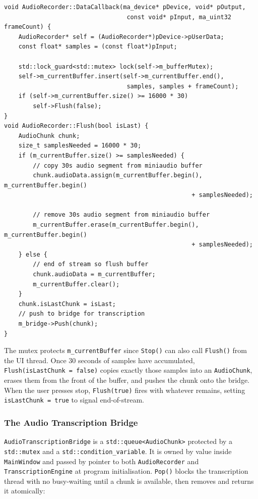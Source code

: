 \begin{verbatim}
void AudioRecorder::DataCallback(ma_device* pDevice, void* pOutput,
                                  const void* pInput, ma_uint32 frameCount) {
    AudioRecorder* self = (AudioRecorder*)pDevice->pUserData;
    const float* samples = (const float*)pInput;

    std::lock_guard<std::mutex> lock(self->m_bufferMutex);
    self->m_currentBuffer.insert(self->m_currentBuffer.end(),
                                  samples, samples + frameCount);
    if (self->m_currentBuffer.size() >= 16000 * 30)
        self->Flush(false);
}
void AudioRecorder::Flush(bool isLast) {
    AudioChunk chunk;
    size_t samplesNeeded = 16000 * 30;
    if (m_currentBuffer.size() >= samplesNeeded) {
        // copy 30s audio segment from miniaudio buffer
        chunk.audioData.assign(m_currentBuffer.begin(), m_currentBuffer.begin() 
                                                    + samplesNeeded);

        // remove 30s audio segment from miniaudio buffer
        m_currentBuffer.erase(m_currentBuffer.begin(), m_currentBuffer.begin() 
                                                    + samplesNeeded);
    } else {
        // end of stream so flush buffer
        chunk.audioData = m_currentBuffer;
        m_currentBuffer.clear();
    }
    chunk.isLastChunk = isLast;
    // push to bridge for transcription
    m_bridge->Push(chunk);
}
\end{verbatim}

The mutex protects \texttt{m\_currentBuffer} since \texttt{Stop()} can also call \texttt{Flush()} from the UI thread. Once 30 seconds of samples have accumulated, \texttt{Flush(isLastChunk = false)} copies exactly those samples into an \texttt{AudioChunk}, erases them from the front of the buffer, and pushes the chunk onto the bridge. When the user presses stop, \texttt{Flush(true)} fires with whatever remains, setting \texttt{isLastChunk = true} to signal end-of-stream.

\subsubsection{The Audio Transcription Bridge}
\texttt{AudioTranscriptionBridge} is a \texttt{std::queue<AudioChunk>} protected by a \texttt{std::mutex} and a \texttt{std::condition\_variable}. It is owned by value inside \texttt{MainWindow} and passed by pointer to both \texttt{AudioRecorder} and \texttt{TranscriptionEngine} at program initialisation. \texttt{Pop()} blocks the transcription thread with no busy-waiting until a chunk is available, then removes and returns it atomically:

